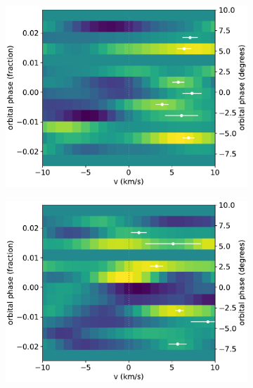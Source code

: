 \documentclass[twocolumn]{aastex631}
\begin{document}
\begin{figure}[ht!]
\begin{subfigure}[b]{0.5\textwidth}
                    \caption{}\label{fig:wind-chars-Fe-combined}
                \end{subfigure}
                 \begin{subfigure}[b]{0.5\textwidth}
                    \includegraphics[width=\textwidth]{plots-updated/line-velocity/binned/pcolor/points/KELT-20b.Na.phase-binned+RVs.pdf}
                    \caption{}\label{fig:wind-chars-Fe-combined}
                \end{subfigure}
                 \begin{subfigure}[b]{0.5\textwidth}
                    \includegraphics[width=\textwidth]{plots-updated/line-velocity/binned/pcolor/points/KELT-20b.Ni.phase-binned+RVs.pdf}

\end{subfigure}
\end{figure}
\end{document}
